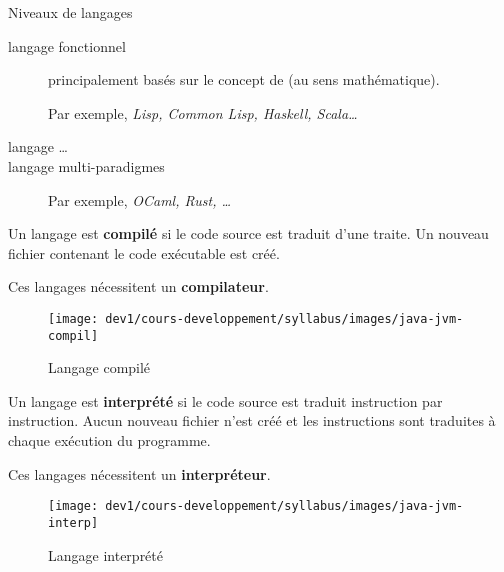 \begin{frame}[fragile]{Niveaux de langages}
  \begin{description}
    \item[langage fonctionnel]
      principalement basés sur le concept de  (au sens
      mathématique).

      Par exemple, \textit{Lisp, Common Lisp, Haskell, Scala\dots}

    \item[langage \dots]

    \item[langage multi-paradigmes]
      Par exemple, \textit{OCaml, Rust, \dots}
  \end{description}
\end{frame}

\begin{frame}
  \begin{definition}
    Un langage est \textbf{compilé} si le code source est traduit d'une
    traite. Un nouveau fichier contenant le code exécutable est créé.
  \end{definition}

  Ces langages nécessitent un \textbf{compilateur}. 

  \begin{figure}[h]
  \begin{center}
  \texttt{[image: dev1/cours-developpement/syllabus/images/java-jvm-compil]}
  \caption{Langage compilé}
  \label{compilé}
  \end{center}
  \end{figure}
\end{frame}

\begin{frame}
  \begin{definition}
    Un langage est \textbf{interprété} si le code source est traduit
    instruction par instruction. Aucun nouveau fichier n'est créé et les
    instructions sont traduites à chaque exécution du programme.
  \end{definition}

  Ces langages nécessitent un \textbf{interpréteur}.

  \begin{figure}[h]
  \begin{center}
  \texttt{[image: dev1/cours-developpement/syllabus/images/java-jvm-interp]}
  \caption{Langage interprété}
  \label{interprété}
  \end{center}
  \end{figure}
\end{frame}


